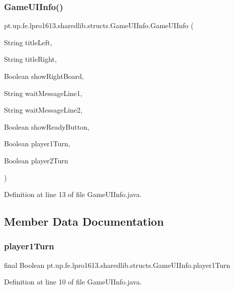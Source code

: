 \subsubsection{\texorpdfstring{Game\+U\+I\+Info()}{GameUIInfo()}}
{\footnotesize\ttfamily pt.\+up.\+fe.\+lpro1613.\+sharedlib.\+structs.\+Game\+U\+I\+Info.\+Game\+U\+I\+Info (\begin{DoxyParamCaption}\item[{String}]{title\+Left,  }\item[{String}]{title\+Right,  }\item[{Boolean}]{show\+Right\+Board,  }\item[{String}]{wait\+Message\+Line1,  }\item[{String}]{wait\+Message\+Line2,  }\item[{Boolean}]{show\+Ready\+Button,  }\item[{Boolean}]{player1\+Turn,  }\item[{Boolean}]{player2\+Turn }\end{DoxyParamCaption})}



Definition at line 13 of file Game\+U\+I\+Info.\+java.



\subsection{Member Data Documentation}
\hypertarget{classpt_1_1up_1_1fe_1_1lpro1613_1_1sharedlib_1_1structs_1_1_game_u_i_info_a157213d6fe17796f0dccb85bf2aba49d}{}\label{classpt_1_1up_1_1fe_1_1lpro1613_1_1sharedlib_1_1structs_1_1_game_u_i_info_a157213d6fe17796f0dccb85bf2aba49d} 
\subsubsection{\texorpdfstring{player1\+Turn}{player1Turn}}
{\footnotesize\ttfamily final Boolean pt.\+up.\+fe.\+lpro1613.\+sharedlib.\+structs.\+Game\+U\+I\+Info.\+player1\+Turn}



Definition at line 10 of file Game\+U\+I\+Info.\+java.

